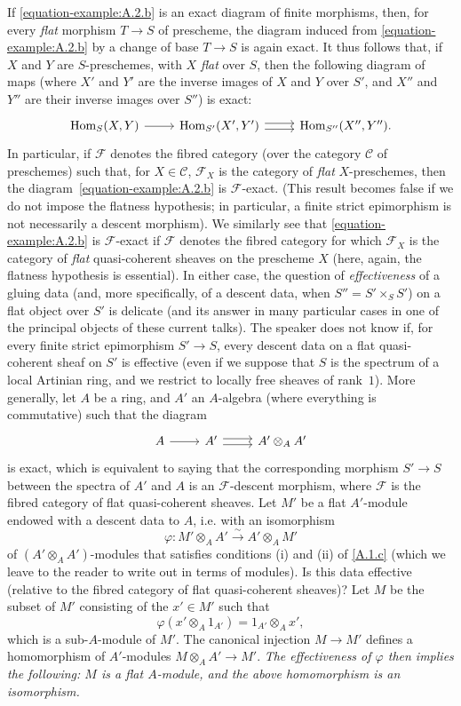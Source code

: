 \documentclass{article}
\theoremstyle{plain}
\theoremstyle{definition}
\newcommand{\sh}[1]{{\mathscr{#1}}}
\newcommand{\cat}[1]{{\mathcal{#1}}}
\DeclareMathOperator{\Hom}{Hom}
\newcommand{\oldpage}[1]{\marginpar{\footnotesize$\Big\vert$ \textit{p.~#1}}}
\begin{document}
If \cref{equation-example:A.2.b} is an exact diagram of finite morphisms, then, for every \emph{flat} morphism $T\to S$ of prescheme, the diagram induced from \cref{equation-example:A.2.b} by a change of base $T\to S$ is again exact.
It thus follows that, if $X$ and $Y$ are $S$-preschemes, with $X$ \emph{flat} over $S$, then the following diagram of maps (where $X'$ and $Y'$ are the inverse images of $X$ and $Y$ over $S'$, and $X''$ and $Y''$ are their inverse images over $S''$) is exact:
\[
  \begin{tikzcd}
    \Hom_S(X,Y) \rar
    & \Hom_{S'}(X',Y') \rar[shift left=1] \rar[shift right=1]
    & \Hom_{S''}(X'',Y'').
  \end{tikzcd}
\]
In particular, if $\sh{F}$ denotes the fibred category (over the category $\cat{C}$ of preschemes) such that, for $X\in\cat{C}$, $\sh{F}_X$ is the category of \emph{flat} $X$-preschemes, then the diagram~\cref{equation-example:A.2.b} is $\sh{F}$-exact.
(This result becomes false if we do not impose the flatness hypothesis; in particular, a finite strict epimorphism is not necessarily a descent morphism).
We similarly see that \cref{equation-example:A.2.b} is $\sh{F}$-exact if $\sh{F}$ denotes the fibred category for which $\sh{F}_X$ is the category of \emph{flat} quasi-coherent sheaves on the prescheme $X$ (here, again, the
\oldpage{190-09}
flatness hypothesis is essential).
In either case, the question of \emph{effectiveness} of a gluing data (and, more specifically, of a descent data, when $S''=S'\times_S S'$) on a flat object over $S'$ is delicate (and its answer in many particular cases in one of the principal objects of these current talks).
The speaker does not know if, for every finite strict epimorphism $S'\to S$, every descent data on a flat quasi-coherent sheaf on $S'$ is effective (even if we suppose that $S$ is the spectrum of a local Artinian ring, and we restrict to locally free sheaves of rank~$1$).
More generally, let $A$ be a ring, and $A'$ an $A$-algebra (where everything is commutative) such that the diagram
\[
  \begin{tikzcd}
    A \rar
    & A' \rar[shift left=1] \rar[shift right=1]
    & A'\otimes_A A'
  \end{tikzcd}
\]
is exact, which is equivalent to saying that the corresponding morphism $S'\to S$ between the spectra of $A'$ and $A$ is an $\sh{F}$-descent morphism, where $\sh{F}$ is the fibred category of flat quasi-coherent sheaves.
Let $M'$ be a flat $A'$-module endowed with a descent data to $A$, i.e. with an isomorphism
\[
  \varphi\colon M'\otimes_A A' \xrightarrow{\sim} A'\otimes_A M'
\]
of $(A'\otimes_A A')$-modules that satisfies conditions (i) and (ii) of \cref{A.1.c} (which we leave to the reader to write out in terms of modules).
Is this data effective (relative to the fibred category of flat quasi-coherent sheaves)?
Let $M$ be the subset of $M'$ consisting of the $x'\in M'$ such that
\[
  \varphi(x'\otimes_A 1_{A'}) = 1_{A'}\otimes_A x',
\]
which is a sub-$A$-module of $M'$.
The canonical injection $M\to M'$ defines a homomorphism of $A'$-modules $M\otimes_A A'\to M'$.
\emph{The effectiveness of $\varphi$ then implies the following: $M$ is a flat $A$-module, and the above homomorphism is an isomorphism.}
\end{document}
